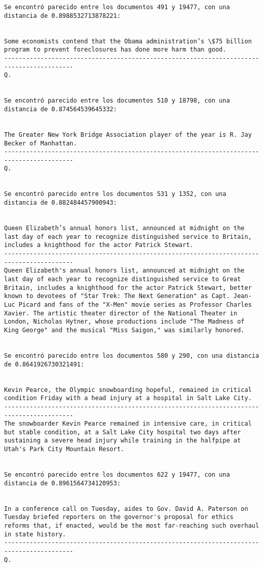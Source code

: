 \documentclass[11pt]{article}
\begin{document}
\begin{Verbatim}[commandchars=\\\{\}]
Se encontró parecido entre los documentos 491 y 19477, con una distancia de 0.8988532713878221:


Some economists contend that the Obama administration’s \$75 billion program to prevent foreclosures has done more harm than good.
-----------------------------------------------------------------------------------------
Q.


Se encontró parecido entre los documentos 510 y 18798, con una distancia de 0.874564539645332:


The Greater New York Bridge Association player of the year is R. Jay Becker of Manhattan.
-----------------------------------------------------------------------------------------
Q.


Se encontró parecido entre los documentos 531 y 1352, con una distancia de 0.882484457900943:


Queen Elizabeth’s annual honors list, announced at midnight on the last day of each year to recognize distinguished service to Britain, includes a knighthood for the actor Patrick Stewart.
-----------------------------------------------------------------------------------------
Queen Elizabeth's annual honors list, announced at midnight on the last day of each year to recognize distinguished service to Great Britain, includes a knighthood for the actor Patrick Stewart, better known to devotees of "Star Trek: The Next Generation" as Capt. Jean-Luc Picard and fans of the "X-Men" movie series as Professor Charles Xavier. The artistic theater director of the National Theater in London, Nicholas Hytner, whose productions include "The Madness of King George" and the musical "Miss Saigon," was similarly honored.


Se encontró parecido entre los documentos 580 y 290, con una distancia de 0.8641926730321491:


Kevin Pearce, the Olympic snowboarding hopeful, remained in critical condition Friday with a head injury at a hospital in Salt Lake City.
-----------------------------------------------------------------------------------------
The snowboarder Kevin Pearce remained in intensive care, in critical but stable condition, at a Salt Lake City hospital two days after sustaining a severe head injury while training in the halfpipe at Utah's Park City Mountain Resort.


Se encontró parecido entre los documentos 622 y 19477, con una distancia de 0.8961564734120953:


In a conference call on Tuesday, aides to Gov. David A. Paterson on Tuesday briefed reporters on the governor's proposal for ethics reforms that, if enacted, would be the most far-reaching such overhaul in state history.
-----------------------------------------------------------------------------------------
Q.



\end{Verbatim}
\end{document}
